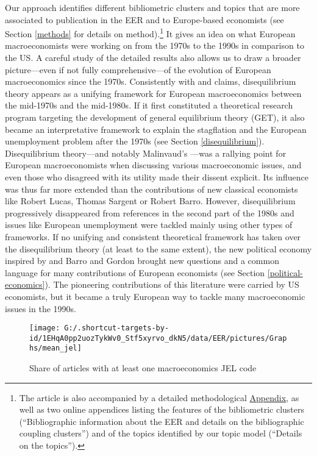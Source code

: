 \documentclass[]{elsarticle} %
\begin{document}
Our approach identifies different bibliometric clusters and topics that
are more associated to publication in the EER and to Europe-based
economists (see Section \ref{methods} for details on method).\footnote{The
  article is also accompanied by a detailed methodological
  \protect\hyperlink{appendix}{Appendix}, as well as two online
  appendices listing the features of the bibliometric clusters
  (``Bibliographic information about the EER and details on the
  bibliographic coupling clusters'') and of the topics identified by our
  topic model (``Details on the topics'').} It gives an idea on what
European macroeconomists were working on from the 1970s to the 1990s in
comparison to the US. A careful study of the detailed results also
allows us to draw a broader picture---even if not fully
comprehensive---of the evolution of European macroeconomics since the
1970s. Consistently with \citet{portes1987} and \citet{goutsmedt2021}
claims, disequilibrium theory appears as a unifying framework for
European macroeconomics between the mid-1970s and the mid-1980s. If it
first constituted a theoretical research program targeting the
development of general equilibrium theory (GET), it also became an
interpretative framework to explain the stagflation and the European
unemployment problem after the 1970s (see Section \ref{disequilibrium}).
Disequilibrium theory---and notably Malinvaud's
\citeyearpar{malinvaud1977}---was a rallying point for European
macroeconomists when discussing various macroeconomic issues, and even
those who disagreed with its utility made their dissent explicit. Its
influence was thus far more extended than the contributions of new
classical economists like Robert Lucas, Thomas Sargent or Robert Barro.
However, disequilibrium progressively disappeared from references in the
second part of the 1980s and issues like European unemployment were
tackled mainly using other types of frameworks. If no unifying and
consistent theoretical framework has taken over the disequilibrium
theory (at least to the same extent), the new political economy inspired
by \citet{kydland1977} and Barro and Gordon
\citetext{\citeyear{barro1983}; \citeyear{barro1983c}} brought new
questions and a common language for many contributions of European
economists (see Section \ref{political-economics}). The pioneering
contributions of this literature were carried by US economists, but it
became a truly European way to tackle many macroeconomic issues in the
1990s.

\begin{figure}[h]

{\centering \texttt{[image: G:/.shortcut-targets-by-id/1EHqA0pp2uozTykWv0\_Stf5xyrvo\_dkN5/data/EER/pictures/Graphs/mean\_jel]} 

}

\caption{Share of articles with at least one macroeconomics JEL code}\label{fig:plot-jel}
\end{figure}
\end{document}
